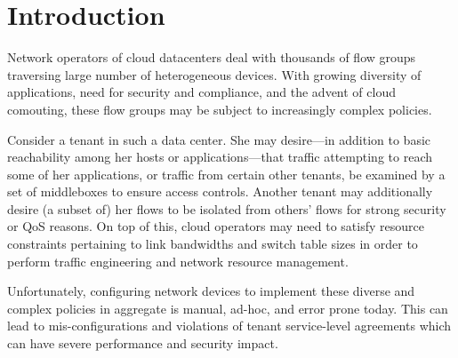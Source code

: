 \section{Introduction}

Network operators of cloud datacenters deal with thousands of flow
groups traversing large number of heterogeneous devices. With growing
diversity of applications, need for security and compliance, and the
advent of cloud comouting, these flow groups may be subject to
increasingly complex policies.

Consider a tenant in such a data center. She may desire---in addition
to basic reachability among her hosts or applications---that
traffic attempting to reach some of her applications, or traffic from
certain other tenants, be examined by a set of middleboxes to ensure
access controls. Another tenant may additionally desire (a subset of)
her flows to be isolated from others' flows for strong security or QoS
reasons. On top of this, cloud operators may need to satisfy resource
constraints pertaining to link bandwidths and switch table sizes in
order to perform traffic engineering and network resource management.

Unfortunately, configuring network devices to implement these diverse
and complex policies in aggregate is manual, ad-hoc, and error prone
today. This can lead to mis-configurations and violations of tenant
service-level agreements which can have severe performance and
security impact.



